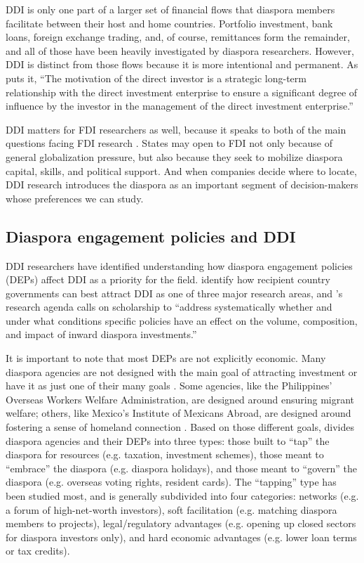 \documentclass[12pt]{article}
\begin{document}
DDI is only one part of a larger set of financial flows that diaspora members facilitate between their host and home countries. Portfolio investment, bank loans, foreign exchange trading, and, of course, remittances form the remainder, and all of those have been heavily investigated by diaspora researchers. However, DDI is distinct from those flows because it is more intentional and permanent. As \citet{naujoks_transnational_2022} puts it, ``The motivation of the direct investor is a strategic long-term relationship with the direct investment enterprise to ensure a significant degree of influence by the investor in the management of the direct investment enterprise.''

DDI matters for FDI researchers as well, because it speaks to both of the main questions facing FDI research \citep{pandya_political_2016}. States may open to FDI not only because of general globalization pressure, but also because they seek to mobilize diaspora capital, skills, and political support. And when companies decide where to locate, DDI research introduces the diaspora as an important segment of decision-makers whose preferences we can study.

\subsection{Diaspora engagement policies and DDI}

DDI researchers have identified understanding how diaspora engagement policies (DEPs) affect DDI as a priority for the field. \citet{alam_iqbal_introduction_2024} identify how recipient country governments can best attract DDI as one of three major research areas, and \citet{naujoks_transnational_2022}'s research agenda calls on scholarship to ``address systematically whether and under what conditions specific policies have an effect on the volume, composition, and impact of inward diaspora investments.''

It is important to note that most DEPs are not explicitly economic. Many diaspora agencies are not designed with the main goal of attracting investment or have it as just one of their many goals \citep{gamlen_explaining_2021}. Some agencies, like the Philippines' Overseas Workers Welfare Administration, are designed around ensuring migrant welfare; others, like Mexico's Institute of Mexicans Abroad, are designed around fostering a sense of homeland connection \citep{orbeta_institutions_2009, delano_alonso_shifting_2018}. Based on those different goals, \citet{gamlen_human_2019} divides diaspora agencies and their DEPs into three types: those built to ``tap'' the diaspora for resources (e.g. taxation, investment schemes), those meant to ``embrace'' the diaspora (e.g. diaspora holidays), and those meant to ``govern'' the diaspora (e.g. overseas voting rights, resident cards). The ``tapping'' type has been studied most, and is generally subdivided into four categories: networks (e.g. a forum of high-net-worth investors), soft facilitation (e.g. matching diaspora members to projects), legal/regulatory advantages (e.g. opening up closed sectors for diaspora investors only), and hard economic advantages (e.g. lower loan terms or tax credits).
\end{document}
